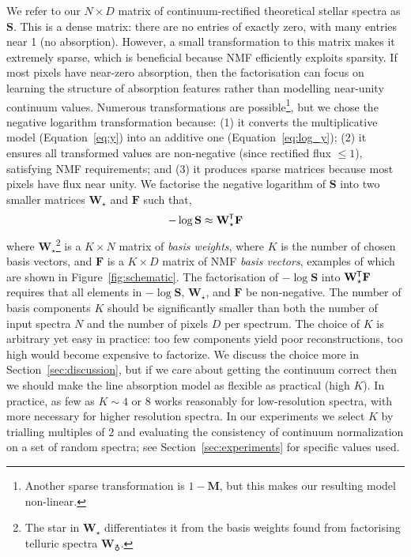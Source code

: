 \documentclass[modern,linenumbers]{aastex631}
\renewcommand{\vec}[1]{\mathbf{#1}}
\newcommand*{\transpose}{^{\mkern-1.5mu\mathsf{T}}}
\renewcommand{\added}[1]{#1}
\newcommand{\removed}[1]{}
\begin{document}
We refer to our $N \times D$ matrix of continuum-rectified theoretical stellar spectra as $\vec{S}$. This is a dense matrix: there are no entries of exactly zero, with many entries near 1 (no absorption). However, a small transformation to this matrix makes it extremely sparse\added{, which is beneficial because NMF efficiently exploits sparsity. If most pixels have near-zero absorption, then the factorisation can focus on learning the structure of absorption features rather than modelling near-unity continuum values}. Numerous transformations are possible\footnote{Another sparse transformation is $1 - \vec{M}$, but this makes our resulting model non-linear.}, but \added{we chose the negative logarithm transformation because: (1) it converts the multiplicative model (Equation~\ref{eq:y}) into an additive one (Equation~\ref{eq:log_y}); (2) it ensures all transformed values are non-negative (since rectified flux $\leq 1$), satisfying NMF requirements; and (3) it produces sparse matrices because most pixels have flux near unity. We} \removed{for many reasons we chose to} factorise the negative logarithm of $\vec{S}$ into two smaller matrices $\vec{W}_\star$ and $\vec{F}$ such that,
\begin{eqnarray}
    \label{eq:nmf}
    -\log{\vec{S}} \approx \vec{W}_\star\transpose\vec{F}
\end{eqnarray}
where $\vec{W}_\star$\footnote{The star in $\vec{W}_\star$ differentiates it from the basis weights found from factorising telluric spectra $\vec{W}_\earth$.} is a $K \times N$ matrix of \emph{basis weights}, where $K$ is the number of chosen basis vectors, and $\vec{F}$ is a $K \times D$ matrix of NMF \emph{basis vectors}\added{, examples of which are shown in Figure~\ref{fig:schematic}}. The factorisation of $-\log{\vec{S}}$ into $\vec{W}_\star\transpose\vec{F}$ requires that all elements in $-\log{\vec{S}}$, $\vec{W}_\star$, and $\vec{F}$ be non-negative. The number of basis components $K$ should be significantly smaller than both the number of input spectra $N$ and the number of pixels $D$ per spectrum. \added{The choice of $K$ is arbitrary yet easy in practice: too few components yield poor reconstructions, too high would become expensive to factorize. We discuss the choice more in Section~\ref{sec:discussion}, but if we care about getting the continuum correct then we should make the line absorption model as flexible as practical (high $K$). In practice, as few as $K \sim 4$ or 8 works reasonably for low-resolution spectra, with more necessary for higher resolution spectra. In our experiments we select $K$ by trialling multiples of 2 and evaluating the consistency of continuum normalization on a set of random spectra; see Section~\ref{sec:experiments} for specific values used.}\\
\end{document}
